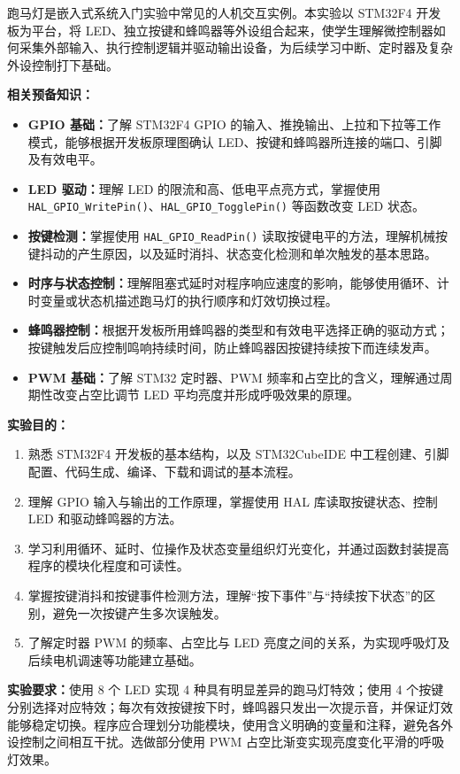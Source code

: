 \documentclass[UTF8,zihao=5,fontset=fandol]{ctexart}
\begin{document}
\begin{reportsection}{\PurposeTitle}{}
  跑马灯是嵌入式系统入门实验中常见的人机交互实例。本实验以 STM32F4 开发板为平台，将 LED、独立按键和蜂鸣器等外设组合起来，使学生理解微控制器如何采集外部输入、执行控制逻辑并驱动输出设备，为后续学习中断、定时器及复杂外设控制打下基础。

  \textbf{相关预备知识：}
  \begin{itemize}
    \item \textbf{GPIO 基础：}了解 STM32F4 GPIO 的输入、推挽输出、上拉和下拉等工作模式，能够根据开发板原理图确认 LED、按键和蜂鸣器所连接的端口、引脚及有效电平。
    \item \textbf{LED 驱动：}理解 LED 的限流和高、低电平点亮方式，掌握使用 \texttt{HAL\_GPIO\_WritePin()}、\texttt{HAL\_GPIO\_TogglePin()} 等函数改变 LED 状态。
    \item \textbf{按键检测：}掌握使用 \texttt{HAL\_GPIO\_ReadPin()} 读取按键电平的方法，理解机械按键抖动的产生原因，以及延时消抖、状态变化检测和单次触发的基本思路。
    \item \textbf{时序与状态控制：}理解阻塞式延时对程序响应速度的影响，能够使用循环、计时变量或状态机描述跑马灯的执行顺序和灯效切换过程。
    \item \textbf{蜂鸣器控制：}根据开发板所用蜂鸣器的类型和有效电平选择正确的驱动方式；按键触发后应控制鸣响持续时间，防止蜂鸣器因按键持续按下而连续发声。
    \item \textbf{PWM 基础：}了解 STM32 定时器、PWM 频率和占空比的含义，理解通过周期性改变占空比调节 LED 平均亮度并形成呼吸效果的原理。
  \end{itemize}

  \textbf{实验目的：}
  \begin{enumerate}[label=\arabic*)]
    \item 熟悉 STM32F4 开发板的基本结构，以及 STM32CubeIDE 中工程创建、引脚配置、代码生成、编译、下载和调试的基本流程。
    \item 理解 GPIO 输入与输出的工作原理，掌握使用 HAL 库读取按键状态、控制 LED 和驱动蜂鸣器的方法。
    \item 学习利用循环、延时、位操作及状态变量组织灯光变化，并通过函数封装提高程序的模块化程度和可读性。
    \item 掌握按键消抖和按键事件检测方法，理解“按下事件”与“持续按下状态”的区别，避免一次按键产生多次误触发。
    \item 了解定时器 PWM 的频率、占空比与 LED 亮度之间的关系，为实现呼吸灯及后续电机调速等功能建立基础。
  \end{enumerate}

  \textbf{实验要求：}使用 8 个 LED 实现 4 种具有明显差异的跑马灯特效；使用 4 个按键分别选择对应特效；每次有效按键按下时，蜂鸣器只发出一次提示音，并保证灯效能够稳定切换。程序应合理划分功能模块，使用含义明确的变量和注释，避免各外设控制之间相互干扰。选做部分使用 PWM 占空比渐变实现亮度变化平滑的呼吸灯效果。
\end{reportsection}
\end{document}
